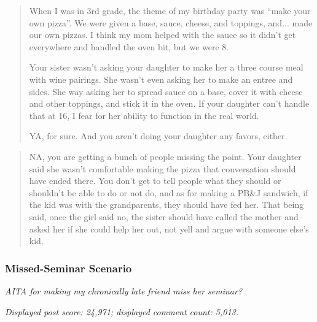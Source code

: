 
\begin{quote}
When I was in 3rd grade, the theme of my birthday party was ``make your
own pizza''. We were given a base, sauce, cheese, and toppings, and...
made our own pizzas. I think my mom helped with the sauce so it didn't
get everywhere and handled the oven bit, but we were 8.

Your sister wasn't asking your daughter to make her a three course meal
with wine pairings. She wasn't even asking her to make an entree and
sides. She way asking her to spread sauce on a base, cover it with
cheese and other toppings, and stick it in the oven. If your daughter
can't handle that at 16, I fear for her ability to function in the real
world.

YA, for sure. And you aren't doing your daughter any favors, either.
\end{quote}


\begin{quote}
NA, you are getting a bunch of people missing the point. Your daughter
said she wasn't comfortable making the pizza that conversation should
have ended there. You don't get to tell people what they should or
shouldn't be able to do or not do, and as for making a PB\&J sandwich,
if the kid was with the grandparents, they should have fed her. That
being said, once the girl said no, the sister should have called the
mother and asked her if she could help her out, not yell and argue with
someone else's kid.
\end{quote}


\subsubsection{Missed-Seminar Scenario}
\label{app:stimulus-xhmshd}

\textit{AITA for making my chronically late friend miss her seminar?}

\noindent\textit{Displayed post score: 24,971; displayed comment count:
5,013.}


